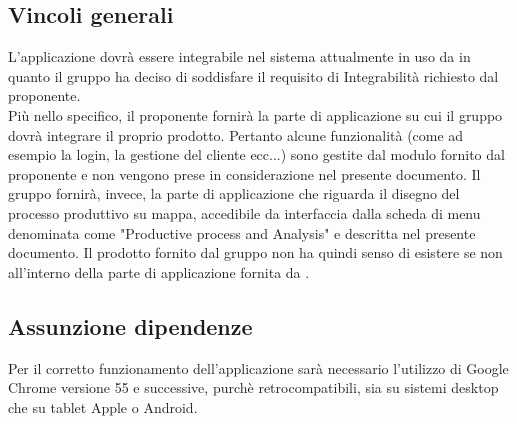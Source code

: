 \subsection{Vincoli generali}
L'applicazione dovrà essere integrabile nel sistema attualmente in uso da \riskapp{} in quanto il gruppo ha deciso di soddisfare il requisito di Integrabilità richiesto dal proponente. 
\\Più nello specifico, il proponente fornirà la parte di applicazione su cui il gruppo dovrà integrare il proprio prodotto. Pertanto alcune funzionalità (come ad esempio la login, la gestione del cliente ecc...) sono gestite dal modulo fornito dal proponente e non vengono prese in considerazione nel presente documento. Il gruppo fornirà, invece, la parte di applicazione che riguarda il disegno del processo produttivo su mappa, accedibile da interfaccia dalla scheda di menu denominata come "Productive process and Analysis" e descritta nel presente documento. Il prodotto fornito dal gruppo non ha quindi senso di esistere  se non all'interno della parte di applicazione fornita da \riskapp.
\subsection{Assunzione dipendenze}
Per il corretto funzionamento dell’applicazione sarà necessario l’utilizzo di Google Chrome versione 55 e successive, purchè retrocompatibili, sia su sistemi desktop  che su tablet Apple o Android.
